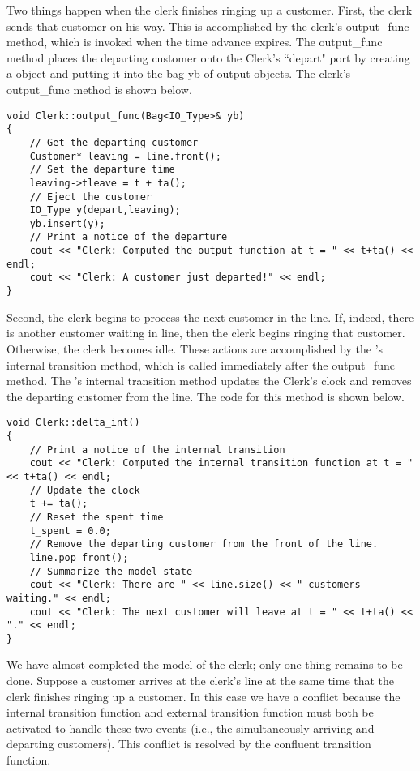 Two things happen when the clerk finishes ringing up a customer. First, the clerk sends that customer on his way. This is accomplished by the clerk's output\_func method, which is invoked when the time advance expires. The output\_func method places the departing customer onto the Clerk's ``depart" port by creating a  object and putting it into the bag yb of output objects. The clerk's output\_func method is shown below.
\begin{verbatim}
void Clerk::output_func(Bag<IO_Type>& yb)
{
    // Get the departing customer
    Customer* leaving = line.front();
    // Set the departure time
    leaving->tleave = t + ta();
    // Eject the customer 
    IO_Type y(depart,leaving);
    yb.insert(y);
    // Print a notice of the departure
    cout << "Clerk: Computed the output function at t = " << t+ta() << endl;
    cout << "Clerk: A customer just departed!" << endl;
}
\end{verbatim}

Second, the clerk begins to process the next customer in the line. If, indeed, there is another customer waiting in line, then the clerk begins ringing that customer. Otherwise, the clerk becomes idle. These actions are accomplished by the 's internal transition method, which is called immediately after the output\_func method. The 's internal transition method updates the Clerk's clock and removes the departing customer from the line. The code for this method is shown below.
\begin{verbatim}
void Clerk::delta_int()
{
    // Print a notice of the internal transition
    cout << "Clerk: Computed the internal transition function at t = " << t+ta() << endl;
    // Update the clock
    t += ta();
    // Reset the spent time 
    t_spent = 0.0;
    // Remove the departing customer from the front of the line.
    line.pop_front();
    // Summarize the model state
    cout << "Clerk: There are " << line.size() << " customers waiting." << endl;
    cout << "Clerk: The next customer will leave at t = " << t+ta() << "." << endl;
}
\end{verbatim}

We have almost completed the model of the clerk; only one thing remains to be done. Suppose a customer arrives at the clerk's line at the same time that the clerk finishes ringing up a customer. In this case we have a conflict because the internal transition function and external transition function must both be activated to handle these two events (i.e., the simultaneously arriving and departing customers). This conflict is resolved by the confluent transition function.

